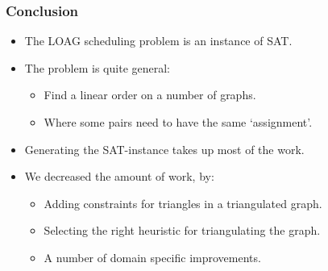 \documentclass{beamer}
\begin{document}
\begin{frame}
    \frametitle{Conclusion}
    \begin{itemize}
        \item The LOAG scheduling problem is an instance of SAT.
        \item The problem is quite general:
            \begin{itemize}
                \item Find a linear order on a number of graphs.
                \item Where some pairs need to have the same `assignment'.
            \end{itemize}
        \item Generating the SAT-instance takes up most of the work.
        \item We decreased the amount of work, by:
        \begin{itemize}
            \item Adding constraints for triangles in a triangulated graph.
            \item Selecting the right heuristic for triangulating the graph.
            \item A number of domain specific improvements.
        \end{itemize}
    \end{itemize}
\end{frame}
\end{document}
